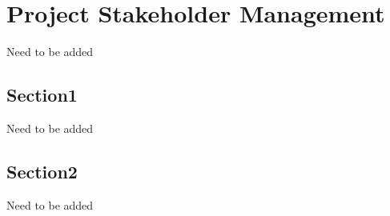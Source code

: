 \chapter{Project Stakeholder Management}
Need to be added
\section{Section1}
Need to be added
\section{Section2}
Need to be added